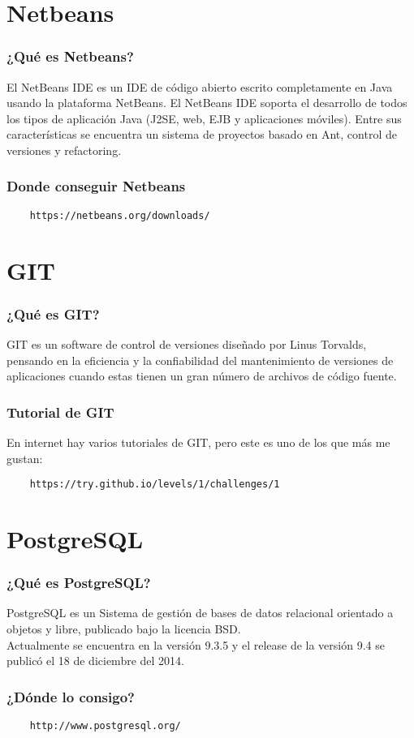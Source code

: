 \documentclass{beamer}
\begin{document}
\section{Netbeans}

\begin{frame}
  \frametitle{¿Qué es Netbeans?}
  El NetBeans IDE es un IDE de código abierto escrito completamente en Java
  usando la plataforma NetBeans. El NetBeans IDE soporta el desarrollo de todos
  los tipos de aplicación Java (J2SE, web, EJB y aplicaciones móviles). Entre
  sus características se encuentra un sistema de proyectos basado en Ant,
  control de versiones y refactoring.
\end{frame}


\begin{frame}[fragile]
  \frametitle{Donde conseguir Netbeans}
  \begin{verbatim}
    https://netbeans.org/downloads/
  \end{verbatim}
\end{frame}

\section{GIT}

\begin{frame}
  \frametitle{¿Qué es GIT?}
  GIT es un software de control de versiones diseñado por Linus Torvalds,
  pensando en la eficiencia y la confiabilidad del mantenimiento de versiones de
  aplicaciones cuando estas tienen un gran número de archivos de código fuente.
\end{frame}

\begin{frame}[fragile]
  \frametitle{Tutorial de GIT}
  En internet hay varios tutoriales de GIT, pero este es uno de los que más me
  gustan:
  \begin{verbatim}
    https://try.github.io/levels/1/challenges/1
  \end{verbatim}
\end{frame}

\section{PostgreSQL}

\begin{frame}
  \frametitle{¿Qué es PostgreSQL?}
  PostgreSQL es un Sistema de gestión de bases de datos relacional orientado a
  objetos y libre, publicado bajo la licencia BSD.\\
  Actualmente se encuentra en la versión 9.3.5 y el release de la versión 9.4
  se publicó el 18 de diciembre del 2014.
\end{frame}

\begin{frame}[fragile]
  \frametitle{¿Dónde lo consigo?}
  \begin{verbatim}
    http://www.postgresql.org/
  \end{verbatim}
\end{frame}
\end{document}
